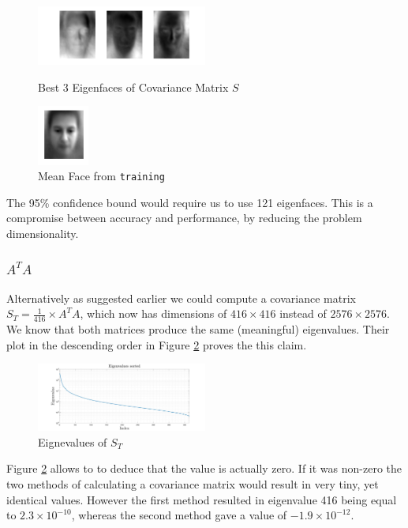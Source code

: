 \documentclass[10pt,twocolumn,letterpaper]{article}
\begin{document}
\begin{figure}[H]

\centering
\includegraphics[width=0.5\textwidth]{../results/Q1A_PCA_Eigenfaces}

  \caption{Best 3 Eigenfaces of Covariance Matrix $S$ \label{fig:Eig2}}

\centering
\includegraphics[width=0.15\textwidth]{../results/Q1A_PCA_Mean}

  \caption{Mean Face from {\tt\small training} \label{fig:Mean}}

\end{figure}


The 95\% confidence bound would require us to use 121 eigenfaces. This is a compromise between accuracy and performance, by reducing the problem dimensionality.
\subsubsection{\boldmath$A^TA$} \label{sec:ata}
Alternatively as suggested earlier we could compute a covariance matrix $S_T = \frac{1}{416} \times A^TA$, which now has dimensions of $416 \times 416$ instead of $2576 \times 2576$. We know \cite{Data Mining} that both matrices produce the same (meaningful) eigenvalues. Their plot in the descending order in Figure \ref{fig:Eig3} proves the this claim.

\begin{figure}[H]
\centering
\includegraphics[width=0.5\textwidth]{../results/Q1B_PCA_Eigenvalues}

  \caption{Eignevalues of $S_T$ \label{fig:Eig3}}

\end{figure}
\setlength{\belowdisplayshortskip}{0pt}
\setlength{\abovedisplayshortskip}{0pt}
Figure \ref{fig:Eig3} allows to to deduce that the  value is actually zero. If it was non-zero the two methods of calculating a covariance matrix would result in very tiny, yet identical values. However the first method resulted in eigenvalue 416 being equal to $2.3 \times 10^{-10}$, whereas the second method gave a value of $-1.9 \times 10^{-12}$.
\end{document}
